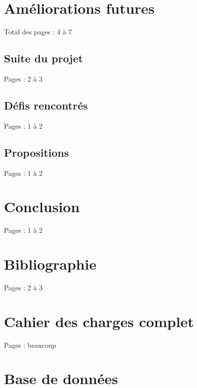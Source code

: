 \documentclass{EPL-master-thesis-covers-FR}
\begin{document}
	\chapter{Améliorations futures}


		Total des pages : 4 à 7

		\section{Suite du projet}
			\label{ref:suite_projet}

			Pages : 2 à 3

		\section{Défis rencontrés}

			Pages : 1 à 2

		\section{Propositions}

			Pages : 1 à 2

	\chapter{Conclusion}

		Pages : 1 à 2

	\chapter*{Bibliographie}

	{}
	

		Pages : 2 à 3

	\appendix

	\chapter{Cahier des charges complet}

		Pages : beaucoup

	\chapter{Base de données}
\end{document}
